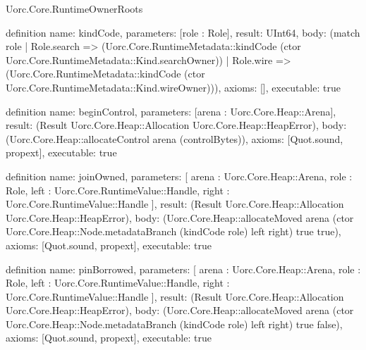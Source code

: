 \begin{lexlean}{Uorc.Core.RuntimeOwnerRoots}
\begin{semanticmodule}
definition{
  name: kindCode,
  parameters: [role : Role],
  result: UInt64,
  body: (match role
    | Role.search => (Uorc.Core.RuntimeMetadata::kindCode (ctor Uorc.Core.RuntimeMetadata::Kind.searchOwner))
    | Role.wire => (Uorc.Core.RuntimeMetadata::kindCode (ctor Uorc.Core.RuntimeMetadata::Kind.wireOwner))),
  axioms: [],
  executable: true
}

definition{
  name: beginControl,
  parameters: [arena : Uorc.Core.Heap::Arena],
  result: (Result Uorc.Core.Heap::Allocation Uorc.Core.Heap::HeapError),
  body: (Uorc.Core.Heap::allocateControl arena (controlBytes)),
  axioms: [Quot.sound, propext],
  executable: true
}

definition{
  name: joinOwned,
  parameters: [
    arena : Uorc.Core.Heap::Arena,
    role : Role,
    left : Uorc.Core.RuntimeValue::Handle,
    right : Uorc.Core.RuntimeValue::Handle
  ],
  result: (Result Uorc.Core.Heap::Allocation Uorc.Core.Heap::HeapError),
  body: (Uorc.Core.Heap::allocateMoved arena (ctor Uorc.Core.Heap::Node.metadataBranch (kindCode role) left right) true true),
  axioms: [Quot.sound, propext],
  executable: true
}

definition{
  name: pinBorrowed,
  parameters: [
    arena : Uorc.Core.Heap::Arena,
    role : Role,
    left : Uorc.Core.RuntimeValue::Handle,
    right : Uorc.Core.RuntimeValue::Handle
  ],
  result: (Result Uorc.Core.Heap::Allocation Uorc.Core.Heap::HeapError),
  body: (Uorc.Core.Heap::allocateMoved arena (ctor Uorc.Core.Heap::Node.metadataBranch (kindCode role) left right) true false),
  axioms: [Quot.sound, propext],
  executable: true
}


\end{semanticmodule}
\end{lexlean}
